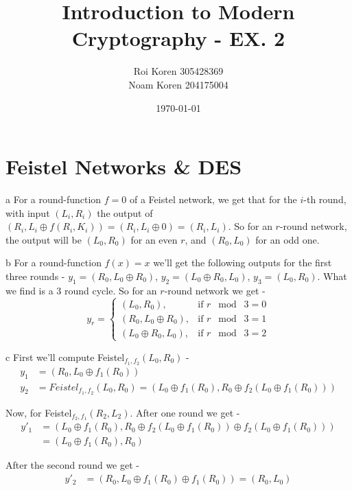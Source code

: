 \documentclass{article}
\begin{document}
\title{Introduction to Modern Cryptography - EX. 2}
\author{Roi Koren 305428369\\ Noam Koren 204175004}
\date{\today}
\maketitle
\newpage
{}

\section{Feistel Networks \& DES}
\begin{paragraph}
	a For a round-function $f = 0$ of a Feistel network, we get that for the $i$-th round, with input $(L_i, R_i)$ the output of $(R_i, L_i\oplus f(R_i, K_i)) = (R_i, L_i\oplus 0) = (R_i, L_i)$. So for an $r$-round network, the output will be $(L_0, R_0)$ for an even $r$, and $(R_0, L_0)$ for an odd one.
\end{paragraph}

\begin{paragraph}
	b For a round-function $f(x) = x$ we'll get the following outputs for the first three rounds - $y_1 = (R_0, L_0\oplus R_0)$, $y_2 = (L_0\oplus R_0, L_0)$, $y_3 = (L_0, R_0)$. What we find is a 3 round cycle. So for an $r$-round network we get -
	\begin{equation*}
	y_r = 
		\begin{cases}
			(L_0, R_0), & \mbox{if } r \;\bmod\; 3 = 0 \\
			(R_0, L_0\oplus R_0), & \mbox{if } r \;\bmod\; 3 = 1 \\
			(L_0\oplus R_0, L_0), & \mbox{if } r \;\bmod\; 3 = 2 
		\end{cases}	
	\end{equation*}
\end{paragraph}

\begin{paragraph}
	c First we'll compute Feistel$_{f_1,f_2}(L_0, R_0)$ -
	\begin{align*}
		y_1 &= (R_0, L_0\oplus f_1(R_0)) \\
		y_2 &= {Feistel}_{f_1,f_2}(L_0, R_0) = (L_0\oplus f_1(R_0), R_0\oplus f_2(L_0\oplus f_1(R_0)))
	\end{align*}
	
	Now, for Feistel$_{f_2,f_1}(R_2, L_2)$. After one round we get - 
	\begin{align*}
		y'_1 &= (L_0\oplus f_1(R_0), R_0\oplus f_2(L_0\oplus f_1(R_0))\oplus f_2(L_0\oplus f_1(R_0))) \\
	  &= (L_0\oplus f_1(R_0), R_0)
	\end{align*}
	
	After the second round we get - 
	\begin{align*}
		y'_2 &= (R_0, L_0\oplus f_1(R_0) \oplus f_1(R_0)) = (R_0, L_0)
	\end{align*}
\end{paragraph}
\end{document}
